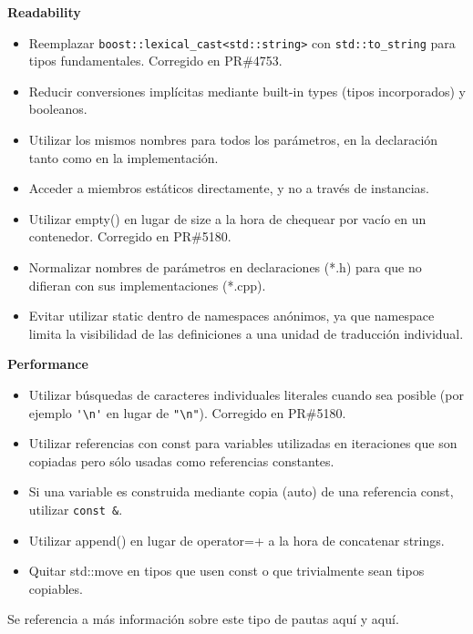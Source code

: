 \textbf{Readability}
\begin{itemize}
  \item Reemplazar \verb|boost::lexical_cast<std::string>| con \verb|std::to_string| para tipos fundamentales. Corregido en PR\#4753.
  \item Reducir conversiones implícitas mediante built-in types (tipos incorporados) y booleanos.
  \item Utilizar los mismos nombres para todos los parámetros, en la declaración tanto como en la implementación.
  \item Acceder a miembros estáticos directamente, y no a través de instancias.
  \item Utilizar empty() en lugar de size a la hora de chequear por vacío en un contenedor. Corregido en PR\#5180.
  \item Normalizar nombres de parámetros en declaraciones (*.h) para que no difieran con sus implementaciones (*.cpp).
  \item Evitar utilizar static dentro de namespaces anónimos, ya que namespace limita la visibilidad de las definiciones a una unidad de traducción individual.\\
\end{itemize}

\textbf{Performance}
\begin{itemize}
  \item Utilizar búsquedas de caracteres individuales literales cuando sea posible (por ejemplo \verb|'\n'| en lugar de \verb|"\n"|). Corregido en PR\#5180.
  \item Utilizar referencias con const para variables utilizadas en iteraciones que son copiadas pero sólo usadas como referencias constantes.
  \item Si una variable es construida mediante copia (auto) de una referencia const, utilizar \verb|const &|.
  \item Utilizar append() en lugar de operator=+ a la hora de concatenar strings.
  \item Quitar std::move en tipos que usen const o que trivialmente sean tipos copiables.
\end{itemize}

Se referencia a más información sobre este tipo de pautas aquí\cite{} y aquí\cite{}. 